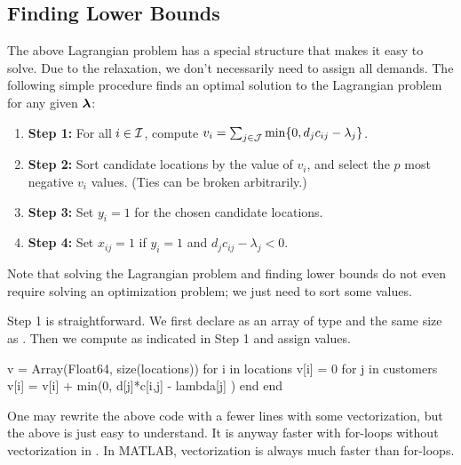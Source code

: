 \subsection{Finding Lower Bounds}
The above Lagrangian problem has a special structure that makes it easy to solve. Due to the relaxation, we don't necessarily need to assign all demands. The following simple procedure finds an optimal solution to the Lagrangian problem for any given $\boldsymbol{\lambda}$:
\begin{enumerate}
\item \textbf{Step 1:} For all $i\in\mathcal{I}$, compute $v_i = \sum_{j\in\mathcal{J}} \min \{ 0, d_j c_{ij} - \lambda_j \}$.
\item \textbf{Step 2:} Sort candidate locations by the value of $v_i$, and select the $p$ most negative $v_i$ values. (Ties can be broken arbitrarily.)
\item \textbf{Step 3:} Set $y_i=1$ for the chosen candidate locations.
\item \textbf{Step 4:} Set $x_{ij}=1$ if $y_i=1$ and $d_j c_{ij} - \lambda_j<0$.
\end{enumerate}
Note that solving the Lagrangian problem and finding lower bounds do not even require solving an optimization problem; we just need to sort some values.

Step 1 is straightforward. We first declare  as an array of type  and the same size as . Then we compute as indicated in Step 1 and assign values.
\begin{code}
v = Array(Float64, size(locations))
for i in locations
    v[i] = 0
    for j in customers
        v[i] = v[i] + min(0, d[j]*c[i,j] - lambda[j] )
    end
end
\end{code}
\noindent One may rewrite the above code with a fewer lines with some vectorization, but the above is just easy to understand. It is anyway faster with for-loops without vectorization in \julia{}. In MATLAB, vectorization is always much faster than for-loops.


